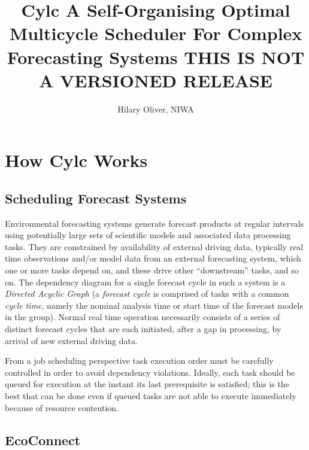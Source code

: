 \documentclass[11pt,a4paper]{article}
\title{Cylc \linebreak A Self-Organising Optimal Multicycle Scheduler \linebreak For Complex Forecasting Systems \linebreak THIS IS NOT A VERSIONED RELEASE}
\author{Hilary Oliver, NIWA}
\begin{document}
\maketitle

\pagebreak



\pagebreak
\tableofcontents
\listoffigures

\pagebreak
\section{How Cylc Works} 
\label{HowCylcWorks}

\subsection{Scheduling Forecast Systems} 
\label{SchedulingForecastSystems}

Environmental forecasting systems generate forecast products at regular
intervals using potentially large sets of scientific models and
associated data processing tasks. They are constrained by availability
of external driving data, typically real time observations and/or model
data from an external forecasting system, which one or more tasks depend
on, and these drive other ``downstream'' tasks, and so on. The
dependency diagram for a single forecast cycle in such a system 
is a {\em Directed Acyclic Graph} (a {\em forecast cycle} is comprised
of tasks with a common {\em cycle time}, namely the nominal analysis
time or start time of the forecast models in the group). Normal real
time operation necessarily consists of a series of distinct forecast
cycles that are each initiated, after a gap in processing, by arrival of
new external driving data.

From a job scheduling perspective task execution order must be carefully
controlled in order to avoid dependency violations. Ideally, each task
should be queued for execution at the instant its last prerequisite is
satisfied; this is the best that can be done even if queued tasks are
not able to execute immediately because of resource contention.


\subsection{EcoConnect} 
\label{EcoConnect}
\end{document}
